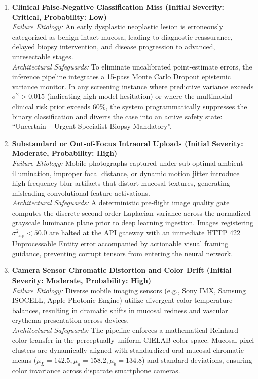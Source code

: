 \documentclass[12pt,a4paper,oneside]{report}
\begin{document}
\begin{enumerate}[label=\textbf{R\arabic*:}, wide=0pt, leftmargin=*]
    \item \textbf{Clinical False-Negative Classification Miss (Initial Severity: Critical, Probability: Low)} \\
    \textit{Failure Etiology:} An early dysplastic neoplastic lesion is erroneously categorized as benign intact mucosa, leading to diagnostic reassurance, delayed biopsy intervention, and disease progression to advanced, unresectable stages. \\
    \textit{Architectural Safeguards:} To eliminate uncalibrated point-estimate errors, the inference pipeline integrates a 15-pass Monte Carlo Dropout epistemic variance monitor. In any screening instance where predictive variance exceeds $\sigma^2 > 0.015$ (indicating high model hesitation) or where the multimodal clinical risk prior exceeds 60\%, the system programmatically suppresses the binary classification and diverts the case into an active safety state: ``Uncertain -- Urgent Specialist Biopsy Mandatory''.
    
    \item \textbf{Substandard or Out-of-Focus Intraoral Uploads (Initial Severity: Moderate, Probability: High)} \\
    \textit{Failure Etiology:} Mobile photographs captured under sub-optimal ambient illumination, improper focal distance, or dynamic motion jitter introduce high-frequency blur artifacts that distort mucosal textures, generating misleading convolutional feature activations. \\
    \textit{Architectural Safeguards:} A deterministic pre-flight image quality gate computes the discrete second-order Laplacian variance across the normalized grayscale luminance plane prior to deep learning ingestion. Images registering $\sigma^2_{\text{Lap}} < 50.0$ are halted at the API gateway with an immediate HTTP 422 Unprocessable Entity error accompanied by actionable visual framing guidance, preventing corrupt tensors from entering the neural network.
    
    \item \textbf{Camera Sensor Chromatic Distortion and Color Drift (Initial Severity: Moderate, Probability: High)} \\
    \textit{Failure Etiology:} Diverse mobile imaging sensors (e.g., Sony IMX, Samsung ISOCELL, Apple Photonic Engine) utilize divergent color temperature balances, resulting in dramatic shifts in mucosal redness and vascular erythema presentation across devices. \\
    \textit{Architectural Safeguards:} The pipeline enforces a mathematical Reinhard color transfer in the perceptually uniform CIELAB color space. Mucosal pixel clusters are dynamically aligned with standardized oral mucosal chromatic means ($\mu_L = 142.5, \mu_a = 158.2, \mu_b = 134.8$) and standard deviations, ensuring color invariance across disparate smartphone cameras.
    

\end{enumerate}
\end{document}
